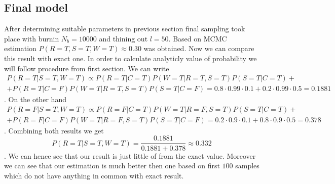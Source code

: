 \documentclass[12pt,a4paper]{article}
\begin{document}
\subsection{Final model}
\hspace{1cm} After determining suitable parameters in previous section final sampling took place with burnin $N_b=10000$ and thining out $l=50$. Based on
MCMC estimation $P(R=T,S=T,W=T)\approx 0.30$ was obtained. Now we can compare this result with exact one. In order to calculate analyticly value of probability 
we will follow procedure from first section. We can write
\begin{align*}
    P(R=T|S=T,W=T)\propto P(R=T|C=T)P(W=T|R=T,S=T)P(S=T|C=T)+\\ +P(R=T|C=F)P(W=T|R=T,S=T)P(S=T|C=F)=0.8\cdot0.99\cdot0.1+0.2\cdot 0.99\cdot0.5=0.1881
\end{align*}
. On the other hand
\begin{align*}
    P(R=F|S=T,W=T)\propto P(R=F|C=T)P(W=T|R=F,S=T)P(S=T|C=T)+\\ +P(R=F|C=F)P(W=T|R=F,S=T)P(S=T|C=F)=0.2\cdot0.9\cdot 0.1+0.8\cdot 0.9\cdot 0.5=0.378
\end{align*}.
Combining both results we get 
\begin{equation*}
    P(R=T|S=T,W=T)=\frac{0.1881}{0.1881+0.378}\approx 0.332
\end{equation*}. We can hence see that our result is just little of from the exact value. Moreover we can see that our estimation is much better then one
based on first $100$ samples which do not have anything in common with exact result.
\end{document}
